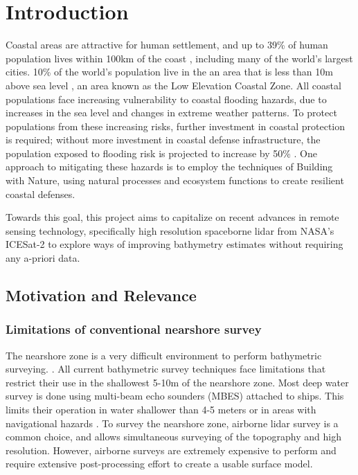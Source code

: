 \chapter{Introduction}


Coastal areas are attractive for human settlement, and up to 39\% of human population lives within 100km of the coast \parencite{Magdalena2021}, including many of the world's largest cities. 10\% of the world's population live in the an area that is less than 10m above sea level \parencite{Neumann2015,Lichter2011}, an area known as the Low Elevation Coastal Zone. All coastal populations face increasing vulnerability to coastal flooding hazards, due to increases in the sea level and changes in extreme weather patterns. To protect populations from these increasing risks, further investment in coastal protection is required; without more investment in coastal defense infrastructure, the population exposed to flooding risk is projected to increase by 50\% \Parencite{Kirezci2020}. One approach to mitigating these hazards is to employ the techniques of Building with Nature, using natural processes and ecosystem functions to create resilient coastal defenses.

Towards this goal, this project aims to capitalize on recent advances in remote sensing technology, specifically high resolution spaceborne lidar from NASA's ICESat-2 to explore ways of improving bathymetry estimates without requiring any a-priori data.  
\section{Motivation and Relevance}


\subsection{Limitations of conventional nearshore survey}

The nearshore zone is a very difficult environment to perform bathymetric surveying. \parencite{Parrish2019}. All current bathymetric survey techniques face limitations that restrict their use in the shallowest 5-10m of the nearshore zone. Most deep water survey is done using multi-beam echo sounders (MBES) attached to ships. This limits their operation in water shallower than 4-5 meters or in areas with navigational hazards \parencite{Cesbron2021,Monteys2015}. To survey the nearshore zone, airborne lidar survey is a common choice, and allows simultaneous surveying of the topography and high resolution. However, airborne surveys are extremely expensive to perform and require extensive post-processing effort to create a usable surface model.


